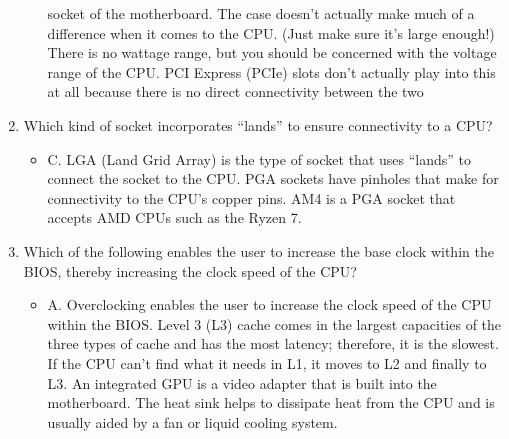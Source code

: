 \documentclass{article}
\begin{document}
\begin{enumerate}
\begin{itemize}
socket of the motherboard. The case doesn’t
actually make much of a difference when it comes
to the CPU. (Just make sure it’s large enough!)
There is no wattage range, but you should be
concerned with the voltage range of the CPU. PCI
Express (PCIe) slots don’t actually play into this at
all because there is no direct connectivity between
the two
    \end{itemize}
    \item Which kind of socket incorporates “lands” to
ensure connectivity to a CPU?
    \begin{itemize}
        \item C. LGA (Land Grid Array) is the type of socket
that uses “lands” to connect the socket to the CPU.
PGA sockets have pinholes that make for
connectivity to the CPU’s copper pins. AM4 is a
PGA socket that accepts AMD CPUs such as the
Ryzen 7.
    \end{itemize}
    \item Which of the following enables the user to
increase the base clock within the BIOS, thereby
increasing the clock speed of the CPU?
    \begin{itemize}
        \item A. Overclocking enables the user to increase the
clock speed of the CPU within the BIOS. Level 3
(L3) cache comes in the largest capacities of the
three types of cache and has the most latency;
therefore, it is the slowest. If the CPU can’t find
what it needs in L1, it moves to L2 and finally to
L3. An integrated GPU is a video adapter that is
built into the motherboard. The heat sink helps to
dissipate heat from the CPU and is usually aided
by a fan or liquid cooling system.
    \end{itemize}
   
\end{enumerate}
\end{document}
